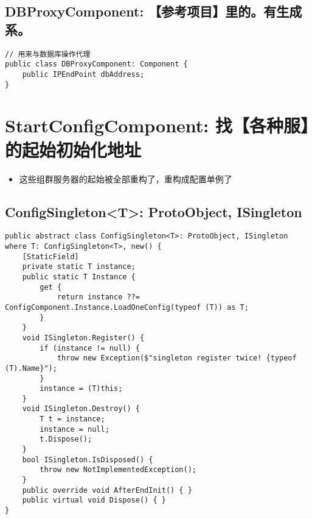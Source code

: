 \documentclass[9pt, b5paper]{article}
\begin{document}
\subsection{DBProxyComponent: 【参考项目】里的。有生成系。}
\label{sec-5-5}
\begin{verbatim}
// 用来与数据库操作代理
public class DBProxyComponent: Component {
    public IPEndPoint dbAddress;
}
\end{verbatim}


\section{StartConfigComponent: 找【各种服】的起始初始化地址}
\label{sec-6}
\begin{itemize}
\item 这些组群服务器的起始被全部重构了，重构成配置单例了
\end{itemize}
\subsection{ConfigSingleton<T>: ProtoObject, ISingleton}
\label{sec-6-1}
\begin{verbatim}
public abstract class ConfigSingleton<T>: ProtoObject, ISingleton where T: ConfigSingleton<T>, new() {
    [StaticField]
    private static T instance;
    public static T Instance {
        get {
            return instance ??= ConfigComponent.Instance.LoadOneConfig(typeof (T)) as T;
        }
    }
    void ISingleton.Register() {
        if (instance != null) {
            throw new Exception($"singleton register twice! {typeof (T).Name}");
        }
        instance = (T)this;
    }
    void ISingleton.Destroy() {
        T t = instance;
        instance = null;
        t.Dispose();
    }
    bool ISingleton.IsDisposed() {
        throw new NotImplementedException();
    }
    public override void AfterEndInit() { }
    public virtual void Dispose() { }
}
\end{verbatim}
\end{document}
